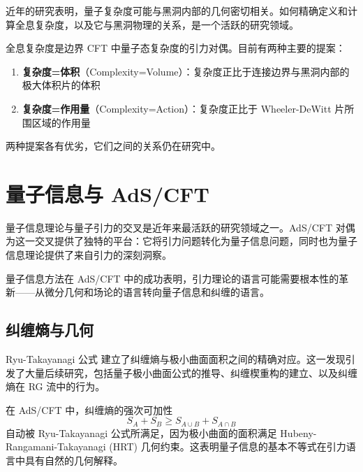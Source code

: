 近年的研究表明，量子复杂度可能与黑洞内部的几何密切相关。如何精确定义和计算全息复杂度，以及它与黑洞物理的关系，是一个活跃的研究领域。

\begin{definition}[全息复杂度]
全息复杂度是边界 CFT 中量子态复杂度的引力对偶。目前有两种主要的提案：
\begin{enumerate}
    \item \textbf{复杂度=体积}（Complexity=Volume）：复杂度正比于连接边界与黑洞内部的极大体积片的体积
    \item \textbf{复杂度=作用量}（Complexity=Action）：复杂度正比于 Wheeler-DeWitt 片所围区域的作用量
\end{enumerate}
两种提案各有优劣，它们之间的关系仍在研究中。
\end{definition}


\section{量子信息与 AdS/CFT}

量子信息理论与量子引力的交叉是近年来最活跃的研究领域之一。AdS/CFT 对偶为这一交叉提供了独特的平台：它将引力问题转化为量子信息问题，同时也为量子信息理论提供了来自引力的深刻洞察。

\begin{note}
量子信息方法在 AdS/CFT 中的成功表明，引力理论的语言可能需要根本性的革新——从微分几何和场论的语言转向量子信息和纠缠的语言。
\end{note}

\subsection{纠缠熵与几何}

Ryu-Takayanagi 公式 \cite{Ryu2006} 建立了纠缠熵与极小曲面面积之间的精确对应。这一发现引发了大量后续研究，包括量子极小曲面公式的推导、纠缠楔重构的建立、以及纠缠熵在 RG 流中的行为。

\begin{property}[纠缠熵的强次可加性]
在 AdS/CFT 中，纠缠熵的强次可加性
\begin{equation}
    S_A + S_B \geq S_{A \cup B} + S_{A \cap B}
\end{equation}
自动被 Ryu-Takayanagi 公式所满足，因为极小曲面的面积满足 Hubeny-Rangamani-Takayanagi (HRT) 几何约束。这表明量子信息的基本不等式在引力语言中具有自然的几何解释。
\end{property}

